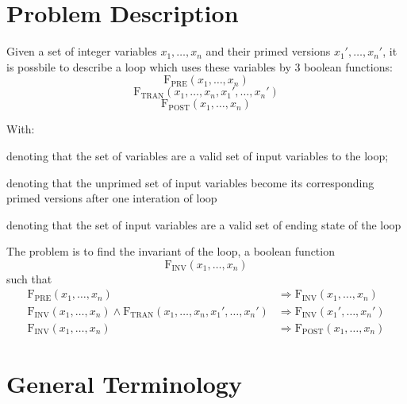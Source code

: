 \documentclass[letterpaper,]{article}
\date{}
\providecommand{\tightlist}{%
  \setlength{\itemsep}{0pt}\setlength{\parskip}{0pt}}
\begin{document}
\newcommand{\pref}{\mathrm{F_{PRE}}}\newcommand{\postf}{\mathrm{F_{POST}}}\newcommand{\transf}{\mathrm{F_{TRAN}}}\newcommand{\invf}{\mathrm{F_{INV}}}\newcommand{\env}{\mathrm{Env}}

\hypertarget{problem-description}{%
\section{Problem Description}\label{problem-description}}

Given a set of integer variables \(x_1, \dots, x_n\) and their primed
versions \(x_1', \dots, x_n'\), it is possbile to describe a loop which
uses these variables by 3 boolean functions:
\[\mathrm{F_{PRE}}(x_1, \dots, x_n)\]
\[\mathrm{F_{TRAN}}(x_1,\dots,x_n,x_1',\dots,x_n')\]
\[\mathrm{F_{POST}}(x_1,\dots,x_n)\]

With:

\begin{description}
\tightlist
\item[\(\mathrm{F_{PRE}}(x_1, \dots, x_n) = 1\)]
denoting that the set of variables are a valid set of input variables to
the loop;
\item[\(\mathrm{F_{TRAN}}(x_1, \dots, x_n, x_1', \dots, x_n') = 1\)]
denoting that the unprimed set of input variables become its
corresponding primed versions after one interation of loop
\item[\(\mathrm{F_{POST}}(x_1, \dots, x_n) = 1\)]
denoting that the set of input variables are a valid set of ending state
of the loop
\end{description}

The problem is to find the invariant of the loop, a boolean function
\[\mathrm{F_{INV}}(x_1,\dots,x_n)\] such that
\[\begin{split}\mathrm{F_{PRE}}(x_1,\dots,x_n) & \Rightarrow \mathrm{F_{INV}}(x_1, \dots, x_n) \\
\mathrm{F_{INV}}(x_1,\dots,x_n) \land \mathrm{F_{TRAN}}(x_1,\dots,x_n,x_1',\dots,x_n') & \Rightarrow \mathrm{F_{INV}}(x_1',\dots,x_n') \\
\mathrm{F_{INV}}(x_1,\dots,x_n) &\Rightarrow\mathrm{F_{POST}}(x_1,\dots,x_n)\end{split}\]

\hypertarget{general-terminology}{%
\section{General Terminology}\label{general-terminology}}
\end{document}
